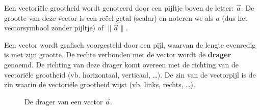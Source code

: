\documentclass{ximera}
\begin{document}
Een vectoriële grootheid wordt genoteerd door een pijltje boven de letter: $\vec{a}$. De grootte van deze vector is een reëel getal (scalar) en noteren we als $a$ (dus het vectorsymbool zonder pijltje) of $\|\vec{a}\|$.

Een vector wordt grafisch voorgesteld door een pijl, waarvan de lengte evenredig is met zijn grootte. De rechte verbonden met de vector wordt de \textbf{drager} genoemd. De richting van deze drager komt overeen met de richting van de vectoriële grootheid (vb. horizontaal, verticaal, \dots). De zin van de vectorpijl is de zin waarin de vectoriële grootheid wijst (vb. links, rechts, \dots).

\begin{figure}[ht!]
    \captionsetup{width=0.85\textwidth}
    \begin{center}
    \end{center}
    \caption{De drager van een vector $\vec{a}$.}
    \label{fig:drager_vector}
\end{figure}
\end{document}
